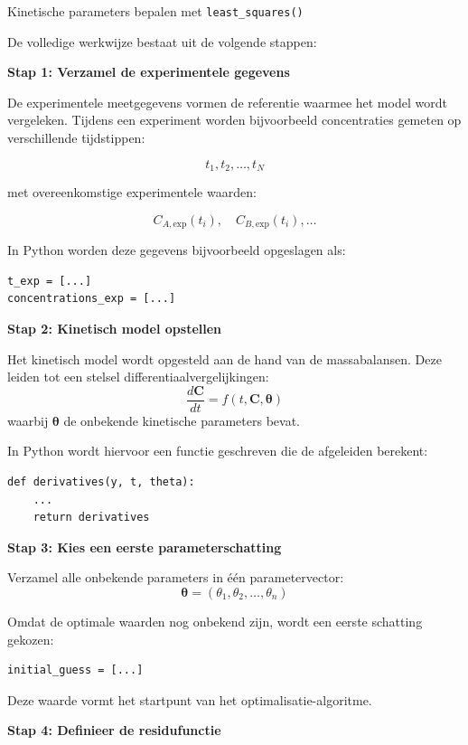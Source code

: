 \documentclass{ximera}
\begin{document}
\begin{procedure} Kinetische parameters bepalen met \texttt{least\_squares()}

De volledige werkwijze bestaat uit de volgende stappen:

\textbf{Stap 1: Verzamel de experimentele gegevens}

De experimentele meetgegevens vormen de referentie waarmee het model wordt
vergeleken. Tijdens een experiment worden bijvoorbeeld concentraties gemeten op
verschillende tijdstippen:

\[
t_1,t_2,\ldots,t_N
\]

met overeenkomstige experimentele waarden:

\[
C_{A,\mathrm{exp}}(t_i),\quad C_{B,\mathrm{exp}}(t_i),\ldots
\]

In Python worden deze gegevens bijvoorbeeld opgeslagen als:

\begin{verbatim}
t_exp = [...]
concentrations_exp = [...]
\end{verbatim}

\bigskip

\textbf{Stap 2: Kinetisch model opstellen}

Het kinetisch model wordt opgesteld aan de hand van de massabalansen.
Deze leiden tot een stelsel differentiaalvergelijkingen:
\[\frac{d\mathbf{C}}{dt}=f(t,\mathbf{C},\boldsymbol{\theta})\]
waarbij $\boldsymbol{\theta}$ de onbekende kinetische parameters bevat.

In Python wordt hiervoor een functie geschreven die de afgeleiden berekent:
\begin{verbatim}
def derivatives(y, t, theta):
    ...
    return derivatives
\end{verbatim}

\bigskip

\textbf{Stap 3: Kies een eerste parameterschatting}

Verzamel alle onbekende parameters in één parametervector:
\[\boldsymbol{\theta}= (\theta_1,\theta_2,\ldots,\theta_n)\]

Omdat de optimale waarden nog onbekend zijn, wordt een eerste schatting gekozen:
\begin{verbatim}
initial_guess = [...]
\end{verbatim}
Deze waarde vormt het startpunt van het optimalisatie-algoritme.

\bigskip

\textbf{Stap 4: Definieer de residufunctie}


\end{procedure}
\end{document}
